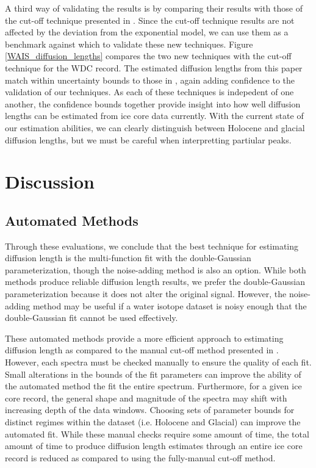 \documentclass[draft, jgrga]{AGUTeX}
\begin{document}
\begin{article}
A third way of validating the results is by comparing their results with those of the cut-off technique presented in \citet{Jones2017a}. Since the cut-off technique results are not affected by the deviation from the exponential model, we can use them as a benchmark against which to validate these new techniques. Figure \ref{WAIS_diffusion_lengths} compares the two new techniques with the cut-off technique for the WDC record. The estimated diffusion lengths from this paper match within uncertainty bounds to those in \cite{Jones2017a}, again adding confidence to the validation of our techniques. As each of these techniques is indepedent of one another, the confidence bounds together provide insight into how well diffusion lengths can be estimated from ice core data currently. With the current state of our estimation abilities, we can clearly distinguish between Holocene and glacial diffusion lengths, but we must be careful when interpretting partiular peaks.


\section{Discussion}

\subsection{Automated Methods}
Through these evaluations, we conclude that the best technique for estimating diffusion length is the multi-function fit with the double-Gaussian parameterization, though the noise-adding method is also an option. While both methods produce reliable diffusion length results, we prefer the double-Gaussian parameterization because it does not alter the original signal. However, the noise-adding method may be useful if a water isotope dataset is noisy enough that the double-Gaussian fit cannot be used effectively.

These automated methods provide a more efficient approach to estimating diffusion length as compared to the manual cut-off method presented in \citet{Jones2017a}. However, each spectra must be checked manually to ensure the quality of each fit. Small alterations in the bounds of the fit parameters can improve the ability of the automated method the fit the entire spectrum. Furthermore, for a given ice core record, the general shape and magnitude of the spectra may shift with increasing depth of the data windows. Choosing sets of parameter bounds for distinct regimes within the dataset (i.e. Holocene and Glacial) can improve the automated fit. While these manual checks require some amount of time, the total amount of time to produce diffusion length estimates through an entire ice core record is reduced as compared to using the fully-manual cut-off method.


\end{article}
\end{document}

